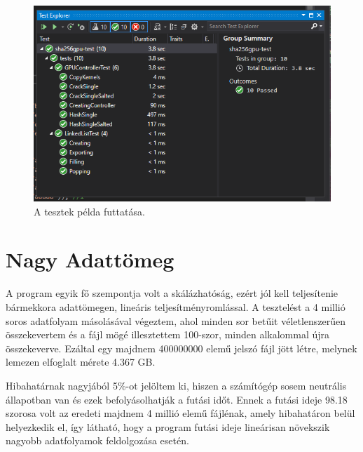 \begin{figure}[H]
    \centering 
    \includegraphics[width=\textwidth]{images/examples/tests.png}
    \caption{A tesztek példa futtatása.}
\end{figure}






\section{Nagy Adattömeg}

A program egyik fő szempontja volt a skálázhatóság, ezért jól kell teljesítenie bármekkora adattömegen, lineáris teljesítményromlással. A tesztelést a 4 millió soros adatfolyam másolásával végeztem, ahol minden sor betűit véletlenszerűen összekevertem és a fájl mögé illesztettem 100-szor, minden alkalommal újra összekeverve. Ezáltal egy majdnem \num{400000000} elemű jelszó fájl jött létre, melynek lemezen elfoglalt mérete 4.367 GB.

Hibahatárnak nagyjából 5\%-ot jelöltem ki, hiszen a számítógép sosem neutrális állapotban van és ezek befolyásolhatják a futási időt. Ennek a futási ideje 98.18 szorosa volt az eredeti majdnem 4 millió elemű fájlénak, amely hibahatáron belül helyezkedik el, így látható, hogy a program futási ideje lineárisan növekszik nagyobb adatfolyamok feldolgozása esetén.